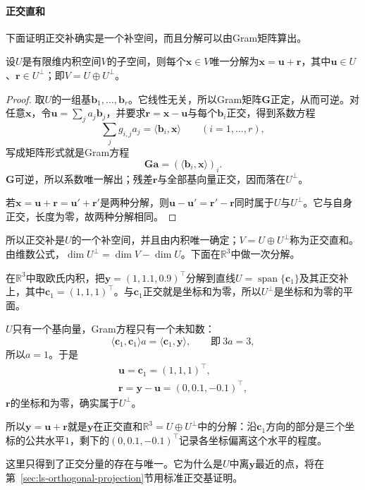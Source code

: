 \paragraph{正交直和}
下面证明正交补确实是一个补空间，而且分解可以由Gram矩阵算出。
\begin{lemma}[正交直和]
\label{lem:ls-orthogonal-decomposition}
设$U$是有限维内积空间$V$的子空间，则每个$\bm x\in V$唯一分解为$\bm x=\bm u+\bm r$，其中$\bm u\in U$、$\bm r\in U^\perp$；即$V=U\oplus U^\perp$。
\end{lemma}
\begin{proof}
取$U$的一组基$\bm b_1,\ldots,\bm b_r$。它线性无关，所以Gram矩阵$\bm G$正定，从而可逆。对任意$\bm x$，令$\bm u=\sum_j a_j\bm b_j$，并要求$\bm r=\bm x-\bm u$与每个$\bm b_i$正交，得到系数方程
\[
 \sum_j g_{i,j}a_j=\langle\bm b_i,\bm x\rangle\qquad(i=1,\ldots,r),
\]
写成矩阵形式就是Gram方程
\begin{equation}
 \bm G\bm a=(\langle\bm b_i,\bm x\rangle)_i .
 \label{eq:ls-gram-equation}
\end{equation}
$\bm G$可逆，所以系数唯一解出；残差$\bm r$与全部基向量正交，因而落在$U^\perp$。

若$\bm x=\bm u+\bm r=\bm u'+\bm r'$是两种分解，则$\bm u-\bm u'=\bm r'-\bm r$同时属于$U$与$U^\perp$。它与自身正交，长度为零，故两种分解相同。
\end{proof}
所以正交补是$U$的一个补空间，并且由内积唯一确定；$V=U\oplus U^\perp$称为正交直和。由维数公式，$\dim U^\perp=\dim V-\dim U$。下面在$\mathbb R^3$中做一次分解。
\begin{example}[向一条直线的正交分解]
\label{ex:ls-orthogonal-decomposition-line}
在$\mathbb R^3$中取欧氏内积，把$\bm y=(1,1.1,0.9)^\top$分解到直线$U=\operatorname{span}\{\bm c_1\}$及其正交补上，其中$\bm c_1=(1,1,1)^\top$。与$\bm c_1$正交就是坐标和为零，所以$U^\perp$是坐标和为零的平面。

$U$只有一个基向量，Gram方程只有一个未知数：
\[
 \langle\bm c_1,\bm c_1\rangle a=\langle\bm c_1,\bm y\rangle,\qquad\text{即}\ 3a=3,
\]
所以$a=1$。于是
\[
 \begin{gathered}
 \bm u=\bm c_1=(1,1,1)^\top,
 \\
 \bm r=\bm y-\bm u=(0,0.1,-0.1)^\top,
 \end{gathered}
\]
$\bm r$的坐标和为零，确实属于$U^\perp$。

所以$\bm y=\bm u+\bm r$就是$\bm y$在正交直和$\mathbb R^3=U\oplus U^\perp$中的分解：沿$\bm c_1$方向的部分是三个坐标的公共水平$1$，剩下的$(0,0.1,-0.1)^\top$记录各坐标偏离这个水平的程度。
\end{example}
这里只得到了正交分量的存在与唯一。它为什么是$U$中离$\bm y$最近的点，将在第~\ref{sec:ls-orthogonal-projection}节用标准正交基证明。

